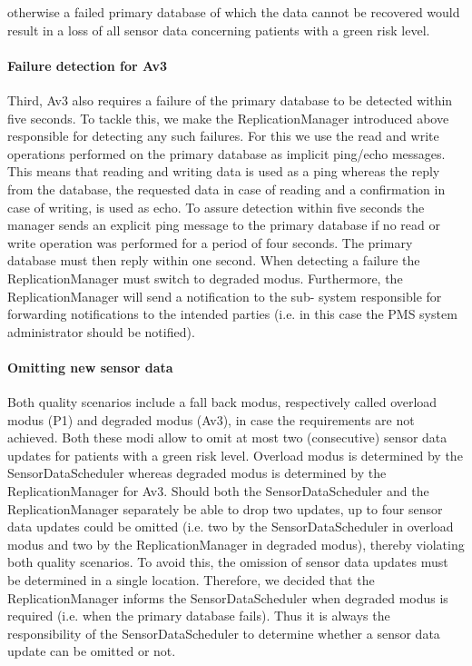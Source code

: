 \documentclass[a4paper,10pt]{article}
\begin{document}
otherwise a failed primary database of which the data cannot be recovered would result in a loss of all sensor data concerning patients with a green risk level.

\paragraph{Failure detection for Av3}
Third, Av3 also requires a failure of the primary database to be detected within five seconds. To tackle this, we make the ReplicationManager introduced above responsible for detecting any such failures. For this we use the read and write operations performed on the primary database as implicit ping/echo messages. This means that reading and writing data is used as a ping whereas the reply from the database, the requested data in case of reading and a confirmation in case of writing, is used as echo. To assure detection within five seconds the manager sends an explicit ping message to the primary database if no read or write operation was performed for a period of four seconds. The primary database must then reply within one second. When detecting a failure the ReplicationManager must switch to degraded modus. Furthermore, the ReplicationManager will send a notification to the sub- system responsible for forwarding notifications to the intended parties (i.e. in this case the PMS system administrator should be notified).

\paragraph{Omitting new sensor data}
Both quality scenarios include a fall back modus, respectively called overload modus (P1) and degraded modus (Av3), in case the requirements are not achieved. Both these modi allow to omit at most two (consecutive) sensor data updates for patients with a green risk level. Overload modus is determined by the SensorDataScheduler whereas degraded modus is determined by the ReplicationManager for Av3. Should both the SensorDataScheduler and the ReplicationManager separately be able to drop two updates, up to four sensor data updates could be omitted (i.e. two by the SensorDataScheduler in overload modus and two by the ReplicationManager in degraded modus), thereby violating both quality scenarios. To avoid this, the omission of sensor data updates must be determined in a single location. Therefore, we decided that the ReplicationManager informs the SensorDataScheduler when degraded modus is required (i.e. when the primary database fails). Thus it is always the responsibility of the SensorDataScheduler to determine whether a sensor data update can be omitted or not.
\end{document}
